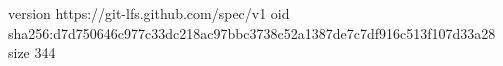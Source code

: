 version https://git-lfs.github.com/spec/v1
oid sha256:d7d750646c977c33dc218ac97bbc3738c52a1387de7c7df916c513f107d33a28
size 344

